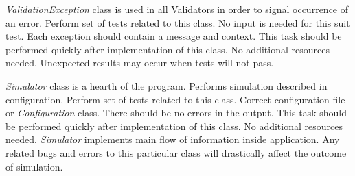 	{
		{
			\emph{ValidationException} class is used in all Validators in order to signal occurrence of an error.
		}
		{
			Perform set of tests related to this class. 
		}
		{
			No input is needed for this suit test.
		}
		{
			Each exception should contain a message and context.
		}
		{
			This task should be performed quickly after implementation of this class.
		}
		{
			No additional resources needed.
		}
		{
			Unexpected results may occur when tests will not pass. 
		}
	}

	{
		{
			\emph{Simulator} class is a hearth of the program. Performs simulation described in configuration.
		}
		{
			Perform set of tests related to this class. 
		}
		{
			Correct configuration file or \emph{Configuration} class.
		}
		{
			There should be no errors in the output.
		}
		{
			This task should be performed quickly after implementation of this class.
		}
		{
			No additional resources needed.
		}
		{
			\emph{Simulator} implements main flow of information inside application. Any related bugs and errors to this particular class will drastically affect the outcome of simulation.
		}
	}